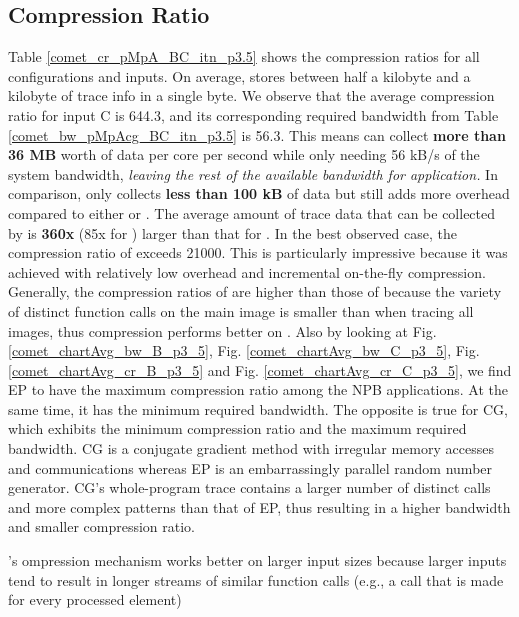   
\subsection{Compression Ratio}
\label{subsec:cr}
Table \ref{comet_cr_pMpA_BC_itn_p3.5} shows the compression ratios for all configurations and inputs.
%
On average, \parlot stores between half a kilobyte and a kilobyte of trace info in a single byte. 
%
We observe that the
average compression ratio for \parlota input C is 644.3, and its
corresponding required bandwidth from Table
\ref{comet_bw_pMpAcg_BC_itn_p3.5} is 56.3.
%
This means \parlot can
collect \textbf{more than 36 MB} worth of data per core per second
while only needing 56 kB/s of the system bandwidth, {\em leaving the rest of the available bandwidth for application.}
%
In comparison, \callgrind only
collects \textbf{less than 100 kB} of data but still adds more
overhead compared to either \parlota or \parlotm . 
%
The average amount of trace data that can be collected by \parlota is
\textbf{360x} (85x for \parlotm) larger than that for \callgrind.
%
In the best observed case, the compression ratio of
\parlot exceeds 21000.
%
This is particularly impressive because it was achieved with relatively low overhead and incremental  
on-the-fly compression.
%
Generally, the compression ratios of \parlotm are higher than those of \parlota because the variety of distinct function calls on the main image is smaller than when tracing all images, thus compression performs better on \parlotm. 
Also by looking at Fig. \ref{comet_chartAvg_bw_B_p3_5}, Fig. \ref{comet_chartAvg_bw_C_p3_5}, Fig. \ref{comet_chartAvg_cr_B_p3_5} and Fig. \ref{comet_chartAvg_cr_C_p3_5}, we find EP to have the maximum compression ratio among the NPB applications. At the same time, it has the minimum required bandwidth. The opposite is true for CG, which exhibits the minimum compression ratio and the maximum required bandwidth. CG is a conjugate gradient method with irregular memory accesses and communications whereas EP is an embarrassingly parallel random number generator. CG's whole-program trace contains a larger number of distinct calls and more complex patterns than that of EP, thus resulting in a higher bandwidth and smaller compression ratio.
%

\parlot's ompression mechanism works better on larger input sizes because larger inputs tend to result in longer streams of similar function calls (e.g., a call that is made for every processed element)
  


